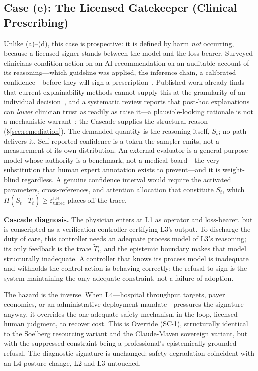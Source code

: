 \subsection{Case (e): The Licensed Gatekeeper (Clinical Prescribing)}

Unlike (a)--(d), this case is prospective: it is defined by harm \emph{not} occurring, because a licensed signer stands between the model and the loss-bearer. Surveyed clinicians condition action on an AI recommendation on an auditable account of its reasoning---which guideline was applied, the inference chain, a calibrated confidence---before they will sign a prescription~\cite{tonekaboni2019, amann2020}. Published work already finds that current explainability methods cannot supply this at the granularity of an individual decision~\cite{ghassemi2021}, and a systematic review reports that post-hoc explanations can \emph{lower} clinician trust as readily as raise it---a plausible-looking rationale is not a mechanistic warrant~\cite{rosenbacke2024}; the Cascade supplies the structural reason (\S\ref{sec:remediation}). The demanded quantity is the reasoning itself, $S_t$; no path delivers it. Self-reported confidence is a token the sampler emits, not a measurement of its own distribution. An external evaluator is a general-purpose model whose authority is a benchmark, not a medical board---the very substitution that human expert annotation exists to prevent---and it is weight-blind regardless. A genuine confidence interval would require the activated parameters, cross-references, and attention allocation that constitute $S_t$, which $H(S_t\mid\tilde T_t)\ge\varepsilon_{\mathrm{unrec}}^{\mathrm{LB}}$ places off the trace.

\textbf{Cascade diagnosis.} The physician enters at L1 as operator and loss-bearer, but is conscripted as a verification controller certifying L3's output. To discharge the duty of care, this controller needs an adequate process model of L3's reasoning; its only feedback is the trace $\tilde T_t$, and the epistemic boundary makes that model structurally inadequate. A controller that knows its process model is inadequate and withholds the control action is behaving correctly: the refusal to sign is the system maintaining the only adequate constraint, not a failure of adoption.

The hazard is the inverse. When L4---hospital throughput targets, payer economics, or an administrative deployment mandate---pressures the signature anyway, it overrides the one adequate safety mechanism in the loop, licensed human judgment, to recover cost. This is Override (SC-1), structurally identical to the Soelberg resourcing variant and the Claude-Maven sovereign variant, but with the suppressed constraint being a professional's epistemically grounded refusal. The diagnostic signature is unchanged: safety degradation coincident with an L4 posture change, L2 and L3 untouched.

